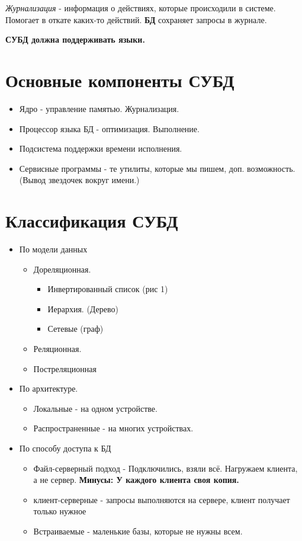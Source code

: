 \textit{Журнализация} - информация о действиях, которые происходили в системе. Помогает
в откате каких-то действий. \textbf{БД} сохраняет запросы в журнале.

\textbf{СУБД должна поддерживать языки.}

\section{Основные компоненты СУБД}

\begin{itemize}
	\item Ядро - управление памятью. Журнализация.
	\item Процессор языка БД - оптимизация. Выполнение.
	\item Подсистема поддержки времени исполнения.
	\item Сервисные программы - те утилиты, которые мы пишем, доп. возможность. (Вывод звездочек вокруг имени.)
\end{itemize}

\section{Классификация СУБД}

\begin{itemize}
	\item По модели данных
	      \begin{itemize}
		      \item Дореляционная.
		            \begin{itemize}
			            \item Инвертированный список (рис 1)
			            \item Иерархия. (Дерево)
			            \item Сетевые (граф)
		            \end{itemize}
		      \item Реляционная.
		      \item Постреляционная
	      \end{itemize}
	\item По архитектуре.
	      \begin{itemize}
		      \item Локальные - на одном устройстве.
		      \item Распространенные - на многих устройствах.
	      \end{itemize}
	\item По способу доступа к БД
	      \begin{itemize}
		      \item Файл-серверный подход - Подключились, взяли всё. Нагружаем клиента,
		            а не сервер. \textbf{Минусы: У каждого клиента своя копия.}
		      \item клиент-серверные - запросы выполняются на сервере, клиент получает
		            только нужное
		      \item Встраиваемые - маленькие базы, которые не нужны всем.
	      \end{itemize}
\end{itemize}

